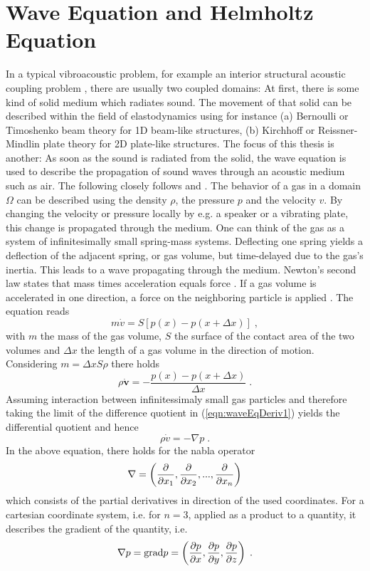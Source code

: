 \documentclass[%
  a4paper,oneside,%
  11pt,%
  smallchapters,
  style=printdev,
  extramargin,
  green,%
  rgb, <cmyk>
  ]{tubsbook}
\begin{document}
\section{Wave Equation and Helmholtz Equation}
In a typical vibroacoustic problem, for example an interior structural acoustic coupling problem \cite{atalla2015}, there are usually two coupled domains: At first, there is some kind of solid medium which radiates sound. The movement of that solid can be described within the field of elastodynamics using for instance (a) Bernoulli or Timoshenko beam theory for 1D beam-like structures, (b) Kirchhoff or Reissner-Mindlin plate theory for 2D plate-like structures. The focus of this thesis is another: As soon as the sound is radiated from the solid, the wave equation is used to describe the propagation of sound waves through an acoustic medium such as air. 
The following closely follows \cite{larson2013} and \cite{moser2005}.
The behavior of a gas in a domain $\Omega$ can be described using the density $\rho$, the pressure $p$ and the velocity $v$. By changing the velocity or pressure locally by e.g. a speaker or a vibrating plate, this change is propagated through the medium. One can think of the gas as a system of infinitesimally small spring-mass systems. Deflecting one spring yields a deflection of the adjacent spring, or gas volume, but time-delayed due to the gas's inertia. This leads to a wave propagating through the medium. 
Newton's second law states that mass times acceleration equals force \cite{Gross2016}. If a gas volume is accelerated in one direction, a force on the neighboring particle is applied \cite{moser2005}. The equation reads
%
\begin{equation}
m \dot{v} = S  \left[  p(x) -p(x + \Delta x)  \right] \;,
\end{equation}
with $m$ the mass of the gas volume, $S$ the surface of the contact area of the two volumes  and $\Delta x$ the length of a gas volume in the direction of motion. Considering $m = \Delta x S \rho$ there holds
\begin{equation}
\rho \dot{\bm{v}} = - \frac{p(x) -p(x + \Delta x)}{\Delta x} \; .
\label{eqn:waveEqDeriv1}
\end{equation}
Assuming interaction between infinitessimaly small gas particles and therefore taking the limit of the difference quotient in (\ref{eqn:waveEqDeriv1}) yields the differential quotient and hence
\begin{equation}
\rho \dot{v} = - \nabla p \;.
\label{eqn:Tragheitsges}
\end{equation}
In the above equation, there holds for the nabla operator \begin{equation}
\nabla =\left( \pdv{}{x_1},\pdv{}{x_2},...,\pdv{}{x_n} \right)
\end{equation}
which consists of the partial derivatives in direction of the used coordinates. For a cartesian coordinate system, i.e. for $n=3$, applied as a product to a quantity, it describes the gradient of the quantity, i.e.
\begin{equation}
\nabla p = \mathrm{grad}p = \left( \pdv{p}{x},\pdv{p}{y},\pdv{p}{z} \right) \;.
\end{equation}
\end{document}
